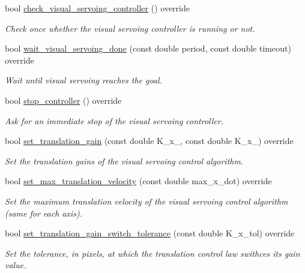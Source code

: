 \begin{DoxyCompactItemize}
bool \hyperlink{classVisualServoingServer_a17a9b2913815c52b5a1bd2fd84d9f18e}{check\+\_\+visual\+\_\+servoing\+\_\+controller} () override
\begin{DoxyCompactList}\small\item\em Check once whether the visual servoing controller is running or not. \end{DoxyCompactList}\item 
bool \hyperlink{classVisualServoingServer_afcd501bb1d5070e8a0735f422a4c9ac0}{wait\+\_\+visual\+\_\+servoing\+\_\+done} (const double period, const double timeout) override
\begin{DoxyCompactList}\small\item\em Wait until visual servoing reaches the goal. \end{DoxyCompactList}\item 
bool \hyperlink{classVisualServoingServer_ac8d5b33c4ae61707e121c5154a973ab8}{stop\+\_\+controller} () override
\begin{DoxyCompactList}\small\item\em Ask for an immediate stop of the visual servoing controller. \end{DoxyCompactList}\item 
bool \hyperlink{classVisualServoingServer_a66324b38d90efb1e68cdfff9fd969487}{set\+\_\+translation\+\_\+gain} (const double K\+\_\+x\+\_, const double K\+\_\+x\+\_) override
\begin{DoxyCompactList}\small\item\em Set the translation gains of the visual servoing control algorithm. \end{DoxyCompactList}\item 
bool \hyperlink{classVisualServoingServer_a393d1a1d1a7a68fc2098a7c7e8724cc9}{set\+\_\+max\+\_\+translation\+\_\+velocity} (const double max\+\_\+x\+\_\+dot) override
\begin{DoxyCompactList}\small\item\em Set the maximum translation velocity of the visual servoing control algorithm (same for each axis). \end{DoxyCompactList}\item 
bool \hyperlink{classVisualServoingServer_a280690a55037cfaaacd39ca95470a507}{set\+\_\+translation\+\_\+gain\+\_\+switch\+\_\+tolerance} (const double K\+\_\+x\+\_\+tol) override
\begin{DoxyCompactList}\small\item\em Set the tolerance, in pixels, at which the translation control law swithces its gain value. \end{DoxyCompactList}\item 

\end{DoxyCompactItemize}
